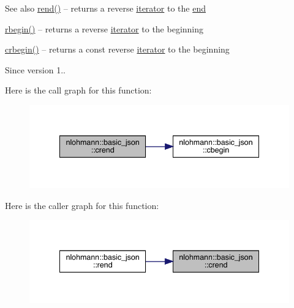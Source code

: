 \begin{DoxySeeAlso}{See also}
\mbox{\hyperlink{classnlohmann_1_1basic__json_ac77aed0925d447744676725ab0b6d535}{rend()}} -- returns a reverse \mbox{\hyperlink{classnlohmann_1_1basic__json_a099316232c76c034030a38faa6e34dca}{iterator}} to the \mbox{\hyperlink{classnlohmann_1_1basic__json_a13e032a02a7fd8a93fdddc2fcbc4763c}{end}} 

\mbox{\hyperlink{classnlohmann_1_1basic__json_a1ef93e2006dbe52667294f5ef38b0b10}{rbegin()}} -- returns a reverse \mbox{\hyperlink{classnlohmann_1_1basic__json_a099316232c76c034030a38faa6e34dca}{iterator}} to the beginning 

\mbox{\hyperlink{classnlohmann_1_1basic__json_a1e0769d22d54573f294da0e5c6abc9de}{crbegin()}} -- returns a const reverse \mbox{\hyperlink{classnlohmann_1_1basic__json_a099316232c76c034030a38faa6e34dca}{iterator}} to the beginning
\end{DoxySeeAlso}
\begin{DoxySince}{Since}
version 1.. 
\end{DoxySince}
Here is the call graph for this function\+:
\nopagebreak
\begin{figure}[H]
\begin{center}
\leavevmode
\includegraphics[width=341pt]{classnlohmann_1_1basic__json_a5795b029dbf28e0cb2c7a439ec5d0a88_cgraph}
\end{center}
\end{figure}
Here is the caller graph for this function\+:
\nopagebreak
\begin{figure}[H]
\begin{center}
\leavevmode
\includegraphics[width=341pt]{classnlohmann_1_1basic__json_a5795b029dbf28e0cb2c7a439ec5d0a88_icgraph}
\end{center}
\end{figure}
